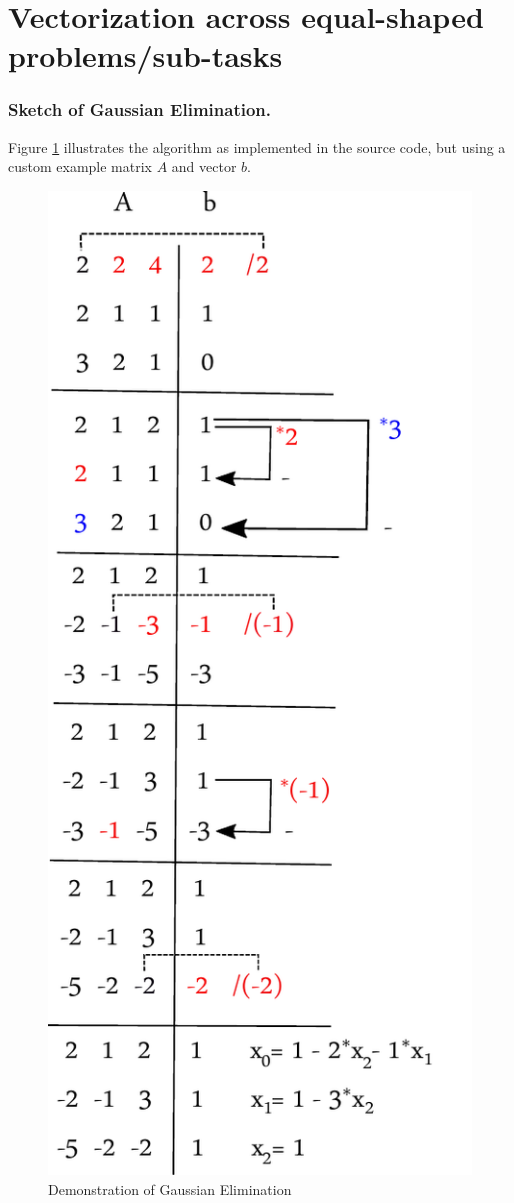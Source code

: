 \documentclass[11pt]{article}
\begin{document}
\section{Vectorization across equal-shaped problems/sub-tasks}
\subsubsection*{Sketch of Gaussian Elimination.}
Figure \ref{graph} illustrates the algorithm as implemented in the source code, but using a custom example matrix $A$ and vector $b$.

\begin{figure}[h]
  \begin{center}
    \includegraphics{graph.pdf}
    \caption{Demonstration of Gaussian Elimination}
    \label{graph}
  \end{center}
\end{figure}
\end{document}
